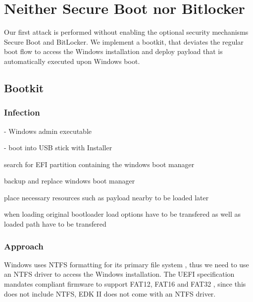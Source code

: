 
\section{Neither Secure Boot nor Bitlocker}

Our first attack is performed without enabling the optional security mechanisms Secure Boot and BitLocker.
We implement a bootkit, that deviates the regular boot flow to access the Windows installation and deploy payload that is automatically executed upon Windows boot.

\subsection{Bootkit}

\subsubsection{Infection}


- Windows admin executable

- boot into USB stick with Installer

search for EFI partition containing the windows boot manager

backup and replace windows boot manager

place necessary resources such as payload nearby to be loaded later

when loading original bootloader load options have to be transfered as well as loaded path have to be transfered

\subsubsection{Approach}

Windows uses NTFS formatting for its primary file system \cite{microsoft-ntfs-overview}, thus we need to use an NTFS driver to access the Windows installation.
The UEFI specification mandates compliant firmware to support FAT12, FAT16 and FAT32 \cite[13.3.1.1]{uefi-spec}, since this does not include NTFS, EDK II does not come with an NTFS driver.

